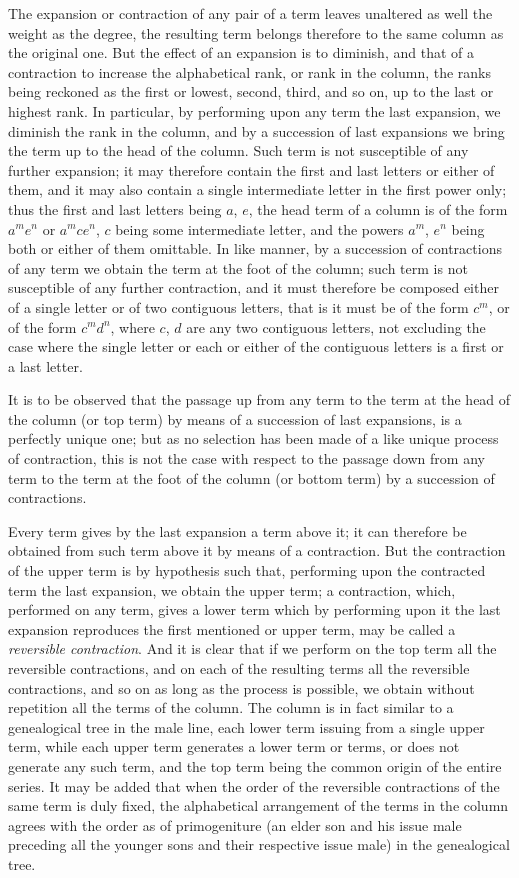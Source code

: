 \documentclass[11pt,a4paper]{article}
\theoremstyle{definition}
\begin{document}
The expansion or contraction of any pair of a term leaves unaltered as well the weight as the degree, the resulting term belongs therefore to the same column as the original one. But the effect of an expansion is to diminish, and that of a contraction to increase the alphabetical rank, or rank in the column, the ranks being reckoned as the first or lowest, second, third, and so on, up to the last or highest rank. In particular, by performing upon any term the last expansion, we diminish the rank in the column, and by a succession of last expansions we bring the term up to the head of the column. Such term is not susceptible of any further expansion; it may therefore contain the first and last letters or either of them, and it may also contain a single intermediate letter in the first power only; thus the first and last letters being $a$, $e$, the head term of a column is of the form $a^me^n$ or $a^mce^n$, $c$ being some intermediate letter, and the powers $a^m$, $e^n$ being both or either of them omittable. In like manner, by a succession of contractions of any term we obtain the term at the foot of the column; such term is not susceptible of any further contraction, and it must therefore be composed either of a single letter or of two contiguous letters, that is it must be of the form $c^m$, or of the form $c^md^n$, where $c$, $d$ are any two contiguous letters, not excluding the case where the single letter or each or either of the contiguous letters is a first or a last letter.

It is to be observed that the passage up from any term to the term at the head of the column (or top term) by means of a succession of last expansions, is a perfectly unique one; but as no selection has been made of a like unique process of contraction, this is not the case with respect to the passage down from any term to the term at the foot of the column (or bottom term) by a succession of contractions.

Every term gives by the last expansion a term above it; it can therefore be obtained from such term above it by means of a contraction. But the contraction of the upper term is by hypothesis such that, performing upon the contracted term the last expansion, we obtain the upper term; a contraction, which, performed on any term, gives a lower term which by performing upon it the last expansion reproduces the first mentioned or upper term, may be called a \textit{reversible contraction}. And it is clear that if we perform on the top term all the reversible contractions, and on each of the resulting terms all the reversible contractions, and so on as long as the process is possible, we obtain without repetition all the terms of the column. The column is in fact similar to a genealogical tree in the male line, each lower term issuing from a single upper term, while each upper term generates a lower term or terms, or does not generate any such term, and the top term being the common origin of the entire series. It may be added that when the order of the reversible contractions of the same term is duly fixed, the alphabetical arrangement of the terms in the column agrees with the order as of primogeniture (an elder son and his issue male preceding all the younger sons and their respective issue male) in the genealogical tree.
\end{document}
